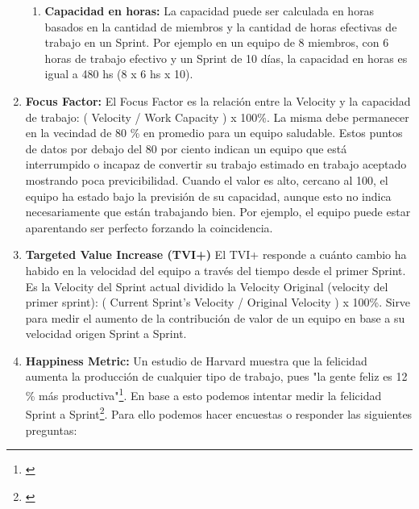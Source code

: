 \begin{enumerate}
{\begin{enumerate}
  \item {\textbf{Capacidad en horas:} La capacidad puede ser calculada en horas basados en la cantidad de miembros y la cantidad de horas efectivas de trabajo en un Sprint. Por ejemplo en un equipo de 8 miembros, con 6 horas de trabajo efectivo y un Sprint de 10 días, la capacidad en horas es igual a 480 hs (8 x 6 hs x 10).}

  \end{enumerate}

}

\item {\textbf{Focus Factor:} El Focus Factor es la relación entre la Velocity y la capacidad de trabajo: ( Velocity / Work Capacity ) x 100\%. La misma debe permanecer en la vecindad de 80 \% en promedio para un equipo saludable. Estos puntos de datos por debajo del 80 por ciento indican un equipo que está interrumpido o incapaz de convertir su trabajo estimado en trabajo aceptado mostrando poca previcibilidad. Cuando el valor es alto, cercano al 100, el equipo ha estado bajo la previsión de su capacidad, aunque esto no indica necesariamente que están trabajando bien. Por ejemplo, el equipo puede estar aparentando ser perfecto forzando la coincidencia.}

\item {\textbf{Targeted Value Increase (TVI+)} El TVI+ responde a cuánto cambio ha habido en la velocidad del equipo a través del tiempo desde el primer Sprint. Es la Velocity del Sprint actual dividido la Velocity Original (velocity del primer sprint): ( Current Sprint’s Velocity / Original Velocity ) x 100\%. Sirve para medir el aumento de la contribución de valor de un equipo en base a su velocidad origen Sprint a Sprint.}


\item {\textbf{Happiness Metric:}
Un estudio de Harvard muestra que la felicidad aumenta la producción de cualquier tipo de trabajo, pues "la gente feliz es 12 \% más productiva"\footnote{\cite{U-K-University-2014}}. En base a esto podemos intentar medir la felicidad Sprint a Sprint\footnote{\cite{Jeff-2014}}. Para ello podemos hacer encuestas o responder las siguientes preguntas:

}
\end{enumerate}
